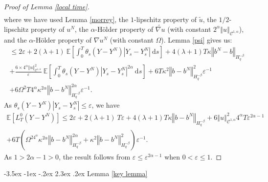 \documentclass[11pt]{enstaPRE}
\makeatletter
\renewcommand\section{\@startsection {section}{1}{\z@}%
    {-3.5ex \@plus -1ex \@minus -.2ex}%
    {2.3ex \@plus.2ex}%
    {\centering\large\scshape\bfseries}}
\newcommand{\norme}[1]{\left\Vert #1\right\Vert}
\newcommand{\E}{\mathbb{E}}
\newcommand{\di}{\mathrm{d}}
\makeatother
\begin{document}
\begin{proof}[Proof of Lemma \ref{local time}]
\begin{multline*}
    \end{multline*}
    where we have used Lemma \ref{morrey}, the $1$-lipschitz property of $\widetilde{u}$, the $1/2$-lipschitz property of $u^N$, the $\alpha$-Hölder property of $\widetilde{\nabla u}$ (with constant $2^\alpha\norme{u}_{\mathcal{C}^{1,\alpha}}$), and the $\alpha$-Hölder property of $\nabla u^N$ (with constant $\Omega$). Lemma \ref{psi} gives us:
    \begin{multline*}
    \leq 2\varepsilon + 2(\lambda + 1)\ \E\left[\int_0^T\theta_s\left(Y-Y^N\right)\left|Y_s - Y^N_s\right|\ \di s \right] + 4(\lambda + 1)T\kappa\norme{b^N-b}_{H^{-\beta}_{q}} \\  
    +\frac{6\times4^{\alpha}\norme{u}_{\mathcal{C}^{1,\alpha}}^2}{\varepsilon}\ \E\left[\int_0^T \theta_s\left(Y-Y^N\right)\left|Y_s - Y^N_s\right|^{2\alpha}\ \di s\right]+ 6T\kappa^2\norme{b-b^N}_{H^{-\beta}_{q}}^2\varepsilon^{-1}\\   + 6\Omega^2T4^{\alpha}\kappa^{2\alpha} \norme{b-b^N}_{H^{-\beta}_q}^{2\alpha}\varepsilon^{-1}.
    \end{multline*}
    As $\theta_s(Y-Y^N)\left|Y_s - Y^N_s\right|\leq \varepsilon$, we have    
    \begin{multline*}
    \E\left[L^0_T(Y-Y^N)\right]\leq 2\varepsilon + 2(\lambda + 1)\ T\varepsilon
    +4(\lambda + 1)T\kappa\norme{b-b^N}_{H^{-\beta}_{q}}+6\norme{u}_{\mathcal{C}^{1,\alpha}}^2 4^{\alpha}T \varepsilon^{2\alpha-1} \\ + 6T\left(\Omega^24^{\alpha}\kappa^{2\alpha} \norme{b-b^N}_{H^{-\beta}_q}^{2\alpha}+\kappa^2\norme{b-b^N}_{H^{-\beta}_{q}}^2\right)\varepsilon^{-1}.
    \end{multline*}    
    As $1>2\alpha-1>0$, the result follows from $\varepsilon\leq\varepsilon^{2\alpha-1}$ when $0<\varepsilon\leq1$.  
    
\end{proof} 

\section{Lemma \ref{key lemma}}
\end{document}
